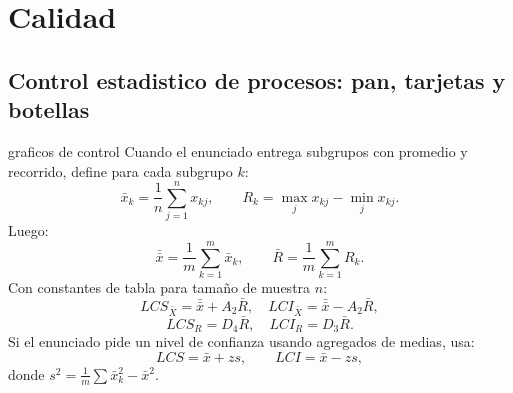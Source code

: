 \section{Calidad}

\subsection{Control estadistico de procesos: pan, tarjetas y botellas}

\begin{materia}{graficos de control}
Cuando el enunciado entrega subgrupos con promedio y recorrido, define para cada subgrupo $k$:
\[
  \bar x_k=\frac{1}{n}\sum_{j=1}^n x_{kj}, \qquad
  R_k=\max_j x_{kj}-\min_j x_{kj}.
\]
Luego:
\[
  \bar{\bar x}=\frac{1}{m}\sum_{k=1}^{m}\bar x_k,
  \qquad
  \bar R=\frac{1}{m}\sum_{k=1}^{m}R_k.
\]
Con constantes de tabla para tamaño de muestra $n$:
\[
  LCS_{\bar X}=\bar{\bar x}+A_2\bar R,\quad
  LCI_{\bar X}=\bar{\bar x}-A_2\bar R,
\]
\[
  LCS_R=D_4\bar R,\quad
  LCI_R=D_3\bar R.
\]
Si el enunciado pide un nivel de confianza usando agregados de medias, usa:
\[
  LCS=\bar x+z s,\qquad LCI=\bar x-zs,
\]
donde $s^2=\frac{1}{m}\sum \bar x_k^2-\bar x^2$.
\end{materia}

